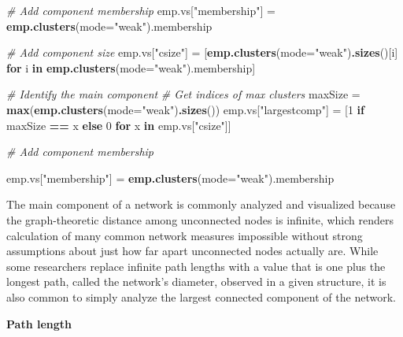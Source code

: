\documentclass[]{krantz}
\newenvironment{Shaded}{\begin{snugshade}}{\end{snugshade}}
\newcommand{\KeywordTok}[1]{\textcolor[rgb]{0.13,0.29,0.53}{\textbf{#1}}}
\newcommand{\DataTypeTok}[1]{\textcolor[rgb]{0.13,0.29,0.53}{#1}}
\newcommand{\DecValTok}[1]{\textcolor[rgb]{0.00,0.00,0.81}{#1}}
\newcommand{\StringTok}[1]{\textcolor[rgb]{0.31,0.60,0.02}{#1}}
\newcommand{\CommentTok}[1]{\textcolor[rgb]{0.56,0.35,0.01}{\textit{#1}}}
\newcommand{\ControlFlowTok}[1]{\textcolor[rgb]{0.13,0.29,0.53}{\textbf{#1}}}
\newcommand{\OperatorTok}[1]{\textcolor[rgb]{0.81,0.36,0.00}{\textbf{#1}}}
\newcommand{\NormalTok}[1]{#1}
\begin{document}
\begin{Shaded}
\begin{Highlighting}[]
\CommentTok{# Add component membership}
\NormalTok{emp.vs[}\StringTok{"membership"}\NormalTok{] =}\StringTok{ }\KeywordTok{emp.clusters}\NormalTok{(}\DataTypeTok{mode=}\StringTok{"weak"}\NormalTok{).membership}

\CommentTok{# Add component size}
\NormalTok{emp.vs[}\StringTok{"csize"}\NormalTok{] =}\StringTok{ }\NormalTok{[}\KeywordTok{emp.clusters}\NormalTok{(}\DataTypeTok{mode=}\StringTok{"weak"}\NormalTok{)}\KeywordTok{.sizes}\NormalTok{()[i] }\ControlFlowTok{for}\NormalTok{ i }\ControlFlowTok{in} \KeywordTok{emp.clusters}\NormalTok{(}\DataTypeTok{mode=}\StringTok{"weak"}\NormalTok{).membership]}

\CommentTok{# Identify the main component}
\CommentTok{# Get indices of max clusters}
\NormalTok{maxSize =}\StringTok{ }\KeywordTok{max}\NormalTok{(}\KeywordTok{emp.clusters}\NormalTok{(}\DataTypeTok{mode=}\StringTok{"weak"}\NormalTok{)}\KeywordTok{.sizes}\NormalTok{())}
\NormalTok{emp.vs[}\StringTok{"largestcomp"}\NormalTok{] =}\StringTok{ }\NormalTok{[}\DecValTok{1} \ControlFlowTok{if}\NormalTok{ maxSize }\OperatorTok{==}\StringTok{ }\NormalTok{x }\ControlFlowTok{else} \DecValTok{0} \ControlFlowTok{for}\NormalTok{ x }\ControlFlowTok{in}\NormalTok{ emp.vs[}\StringTok{"csize"}\NormalTok{]]}

\CommentTok{# Add component membership}

\NormalTok{emp.vs[}\StringTok{"membership"}\NormalTok{] =}\StringTok{ }\KeywordTok{emp.clusters}\NormalTok{(}\DataTypeTok{mode=}\StringTok{"weak"}\NormalTok{).membership}
\end{Highlighting}
\end{Shaded}

The main component of a network is commonly analyzed and visualized
because the graph-theoretic distance among unconnected nodes is
infinite, which renders calculation of many common network measures
impossible without strong assumptions about just how far apart
unconnected nodes actually are. While some researchers replace infinite
path lengths with a value that is one plus the longest path, called the
network's diameter, observed in a given structure, it is also common to
simply analyze the largest connected component of the network.

\textbf{Path length}
\end{document}
